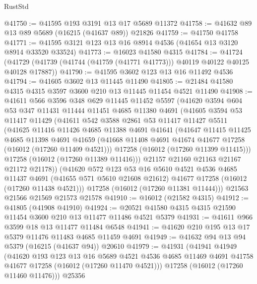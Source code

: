 \begin{lexlean}{RustStd}
\begin{coremodule}
@41750 := @41595 @193 @3191 @13 @17 @5689 @11372
@41758 := @41632 @89 @13 @89 @5689 (@16215 (@41637 @89)) @21826
@41759 := @41750 @41758
@41771 := @41595 @3121 @123 @13 @16 @8914 @4536 (@41654 @13 @3120 @8914 @33520 @33524)
@41773 := @16023 @41580 @4315
@41784 := @41724
    (@41729 (@41739 (@41744 (@41759 (@41771 @41773))) @40119 @40122 @40125 @40128 @17887))
@41790 := @41595 @3602 @123 @13 @16 @11492 @4536
@41794 := @41605 @3602 @13 @11445 @11490
@41805 := @21484 @41580 @4315 @4315 @3597 @3600 @210 @13 @11445 @11454 @4521 @11490
@41908 := @41611
    @566
    @3596
    @348
    @629
    @11445
    @11452
    @5597
    (@41620
      @3594
      @604
      @53
      @347
      @11431
      @11444
      @11451
      @4685
      @11380
      @4691
      (@41605
        @3594
        @53
        @11417
        @11429
        (@41611
          @542
          @3588
          @2861
          @53
          @11417
          @11427
          @5511
          (@41625
            @11416
            @11426
            @4685
            @11388
            @4691
            @41641
            (@41647
              @11415
              @11425
              @4685
              @11398
              @4691
              @41659
              (@41668 @11408 @4691 @41674 @41677 @17258 (@16012 (@17260 @11409 @4521)))
              @17258
              (@16012 (@17260 @11399 @11415)))
            @17258
            (@16012 (@17260 @11389 @11416)))
          @21157
          @21160
          @21163
          @21167
          @21172
          @21178))
      (@41620
        @572
        @123
        @53
        @16
        @5610
        @4521
        @4536
        @4685
        @11437
        @4691
        (@41655 @571 @5610 @21608 @21612)
        @41677
        @17258
        (@16012 (@17260 @11438 @4521)))
      @17258
      (@16012 (@17260 @11381 @11444)))
    @21563
    @21566
    @21569
    @21573
    @21578
@41910 := @16012 (@21582 @4315)
@41912 := @41805 (@41908 @41910)
@41924 := @20521 @41580 @4315 @4315 @21590 @11454 @3600 @210 @13 @11477 @11486 @4521 @5379
@41931 := @41611 @966 @3599 @18 @13 @11477 @11484 @6548
@41941 := @41620 @210 @195 @13 @17 @5379 @11476 @11483 @4685 @11459 @4691
@41949 := @41632 @94 @13 @94 @5379 (@16215 (@41637 @94)) @20610
@41979 := @41931
    (@41941
      @41949
      (@41620
        @193
        @123
        @13
        @16
        @5689
        @4521
        @4536
        @4685
        @11469
        @4691
        @41758
        @41677
        @17258
        (@16012 (@17260 @11470 @4521)))
      @17258
      (@16012 (@17260 @11460 @11476)))
    @25356

\end{coremodule}
\end{lexlean}
